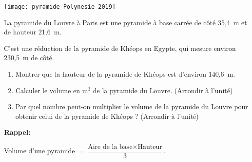 
\medskip

\begin{center}
\texttt{[image: pyramide\_Polynesie\_2019]}
\end{center}

La pyramide du Louvre à Paris est une pyramide à base carrée de côté 35,4~m et de hauteur
21,6~m.

C'est une réduction de la pyramide de Khéops en Egypte, qui mesure environ 230,5~m de côté.

\medskip

\begin{enumerate}
\item Montrer que la hauteur de la pyramide de Khéops est d'environ 140,6~m.
\item Calculer le volume en m$^3$ de la pyramide du Louvre. (Arrondir à l'unité)
\item Par quel nombre peut-on multiplier le volume de la pyramide du Louvre pour obtenir celui de la pyramide de Khéops ? (Arrondir à l'unité)
\end{enumerate}

\medskip

\textbf{Rappel:}

Volume d'une pyramide $ =  \dfrac{\text{Aire de la base} \times \text{Hauteur}}{3}$.

\bigskip

